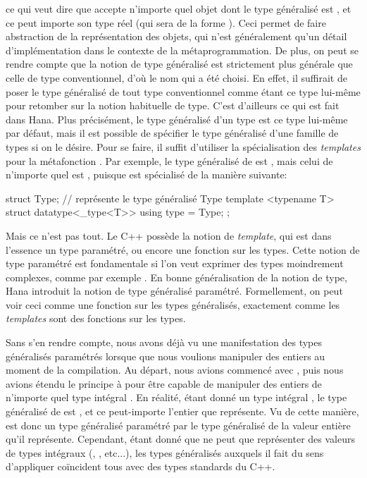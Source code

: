 ce qui veut dire que  accepte n'importe quel objet dont le
type généralisé est , et ce peut importe son type réel (qui sera
de la forme ). Ceci permet de faire abstraction de la
représentation des objets, qui n'est généralement qu'un détail
d'implémentation dans le contexte de la métaprogrammation. De plus, on peut se
rendre compte que la notion de type généralisé est strictement plus générale
que celle de type conventionnel, d'où le nom qui a été choisi. En effet, il
suffirait de poser le type généralisé de tout type conventionnel comme étant
ce type lui-même pour retomber sur la notion habituelle de type. C'est
d'ailleurs ce qui est fait dans Hana. Plus précisément, le type généralisé
d'un type est ce type lui-même par défaut, mais il est possible de spécifier
le type généralisé d'une famille de types si on le désire. Pour se faire, il
suffit d'utiliser la spécialisation des \textit{templates} pour la métafonction
. Par exemple, le type généralisé de  est ,
mais celui de n'importe quel  est , puisque
 est spécialisé de la manière suivante:
\begin{cpp}
    struct Type; // représente le type généralisé Type
    template <typename T>
    struct datatype<_type<T>> {
        using type = Type;
    };
\end{cpp}

Mais ce n'est pas tout. Le C++ possède la notion de \textit{template}, qui est
dans l'essence un type paramétré, ou encore une fonction sur les types. Cette
notion de type paramétré est fondamentale si l'on veut exprimer des
types moindrement complexes, comme par exemple . En
bonne généralisation de la notion de type, Hana introduit la notion de
type généralisé paramétré. Formellement, on peut voir ceci comme une
fonction sur les types généralisés, exactement comme les \textit{templates}
sont des fonctions sur les types.

Sans s'en rendre compte, nous avons déjà vu une manifestation des types
généralisés paramétrés lorsque que nous voulions manipuler des entiers
au moment de la compilation. Au départ, nous avions commencé avec
, puis nous avions étendu le principe à
 pour être capable de manipuler des entiers
de n'importe quel type intégral . En réalité, étant donné un type
intégral , le type généralisé de 
est , et ce peut-importe l'entier  que
 représente. Vu de cette manière,
 est donc un type généralisé paramétré par
le type généralisé  de la valeur entière qu'il représente.
Cependant, étant donné que  ne peut que représenter
des valeurs de types intégraux (, , etc...), les types
généralisés auxquels il fait du sens d'appliquer 
coïncident tous avec des types standards du C++.

